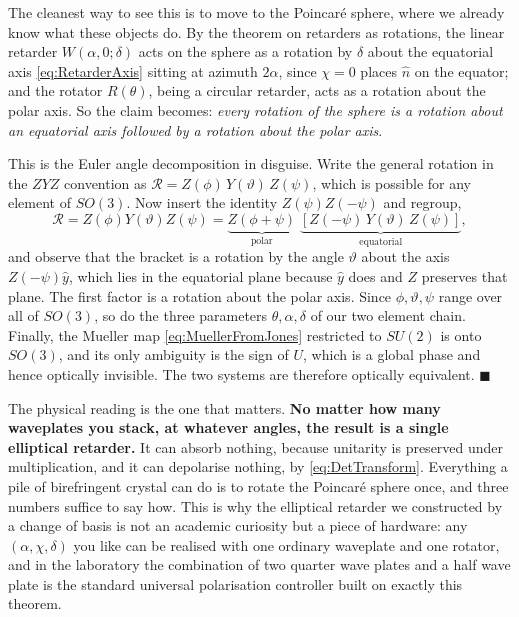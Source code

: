             The cleanest way to see this is to move to the Poincaré sphere, where we already know what these objects do. By the theorem on retarders as rotations, the linear retarder $W(\alpha,0;\delta)$ acts on the sphere as a rotation by $\delta$ about the equatorial axis \ref{eq:RetarderAxis} sitting at azimuth $2\alpha$, since $\chi=0$ places $\hat n$ on the equator; and the rotator $R(\theta)$, being a circular retarder, acts as a rotation about the polar axis. So the claim becomes: \textit{every rotation of the sphere is a rotation about an equatorial axis followed by a rotation about the polar axis}.

            This is the Euler angle decomposition in disguise. Write the general rotation in the $ZYZ$ convention as $\mathcal{R}=Z(\phi)\,Y(\vartheta)\,Z(\psi)$, which is possible for any element of $SO(3)$. Now insert the identity $Z(\psi)Z(-\psi)$ and regroup,
            \begin{equation*}
                \mathcal{R} = Z(\phi)Y(\vartheta)Z(\psi) = \underbrace{Z\left(\phi+\psi\right)}_{\text{polar}}\;\underbrace{\left[Z(-\psi)\,Y(\vartheta)\,Z(\psi)\right]}_{\text{equatorial}} ,
            \end{equation*}
            and observe that the bracket is a rotation by the angle $\vartheta$ about the axis $Z(-\psi)\hat{y}$, which lies in the equatorial plane because $\hat y$ does and $Z$ preserves that plane. The first factor is a rotation about the polar axis. Since $\phi,\vartheta,\psi$ range over all of $SO(3)$, so do the three parameters $\theta,\alpha,\delta$ of our two element chain. Finally, the Mueller map \ref{eq:MuellerFromJones} restricted to $SU(2)$ is onto $SO(3)$, and its only ambiguity is the sign of $U$, which is a global phase and hence optically invisible. The two systems are therefore optically equivalent. $\blacksquare$

            The physical reading is the one that matters. \textbf{No matter how many waveplates you stack, at whatever angles, the result is a single elliptical retarder.} It can absorb nothing, because unitarity is preserved under multiplication, and it can depolarise nothing, by \ref{eq:DetTransform}. Everything a pile of birefringent crystal can do is to rotate the Poincaré sphere once, and three numbers suffice to say how. This is why the elliptical retarder we constructed by a change of basis is not an academic curiosity but a piece of hardware: any $(\alpha,\chi,\delta)$ you like can be realised with one ordinary waveplate and one rotator, and in the laboratory the combination of two quarter wave plates and a half wave plate is the standard universal polarisation controller built on exactly this theorem.

